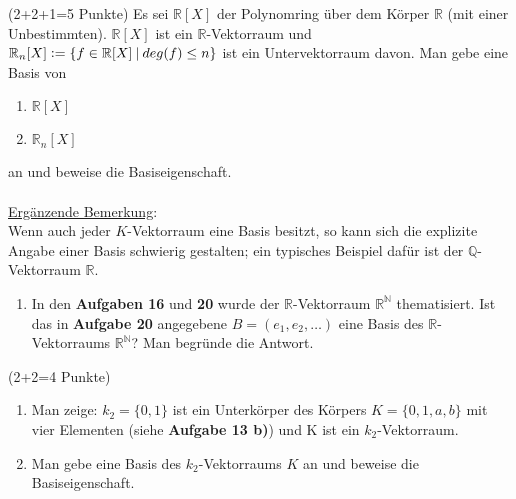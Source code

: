 \documentclass{uebblatt}
\begin{document}

\begin{aufgabe}{ (2+2+1=5 Punkte)}
Es sei $\mathbb{R}[X]$ der Polynomring über dem Körper $\mathbb{R}$ (mit einer Unbestimmten). $\mathbb{R}[X]$ ist ein $\mathbb{R}$-Vektorraum und $\mathbb{R}_n[X] \vcentcolon= \{f \in \mathbb{R}[X] \> | \> deg(f) \le n\}$ ist ein Untervektorraum davon. Man gebe eine Basis von
\begin{enumerate}
\item $\mathbb{R}[X]$
\item $\mathbb{R}_n[X]$
\end{enumerate}
an und beweise die Basiseigenschaft.\\ \\
\underline{Ergänzende Bemerkung}: \\
Wenn auch jeder $K$-Vektorraum eine Basis besitzt, so kann sich    die explizite Angabe einer Basis schwierig gestalten; ein typisches Beispiel dafür ist der $\mathbb{Q}$-Vektorraum $\mathbb{R}$. 
\begin{enumerate}[resume]
\item In den \textbf{Aufgaben 16} und \textbf{20} wurde der $\mathbb{R}$-Vektorraum $\mathbb{R}^\mathbb{N}$ thematisiert. Ist das in \textbf{Aufgabe 20} angegebene $B = (e_1, e_2, …)$ eine Basis des $\mathbb{R}$-Vektorraums $\mathbb{R}^\mathbb{N}$? Man begründe die Antwort.
\end{enumerate}
\end{aufgabe}


\begin{aufgabe}{ (2+2=4 Punkte)}
\begin{enumerate}
\item Man zeige: $k_2 = \{0, 1\}$ ist ein Unterkörper des Körpers $K = \{0, 1, a, b\}$ mit vier Elementen (siehe \textbf{Aufgabe 13 b)}) und K ist ein $k_2$-Vektorraum.
\item Man gebe eine Basis des $k_2$-Vektorraums $K$ an und beweise die Basiseigenschaft.
\end{enumerate}
\end{aufgabe}
\end{document}
